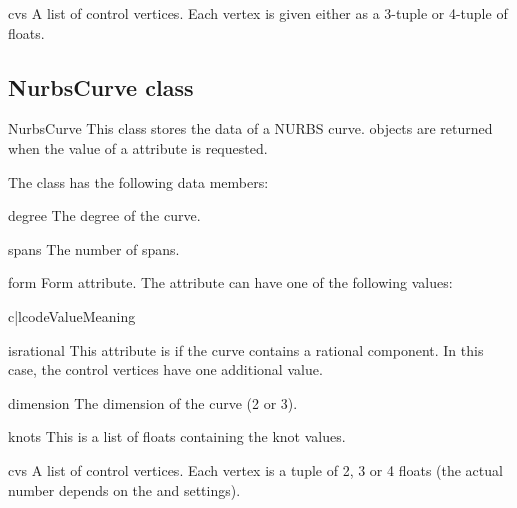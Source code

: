 \begin{memberdesc}{cvs}
A list of control vertices. Each vertex is given either as a 3-tuple or
4-tuple of floats.
\end{memberdesc}

\subsection{NurbsCurve class}
\label{nurbscurve}

\begin{classdesc*}{NurbsCurve}
This class stores the data of a NURBS curve.  objects
are returned when the value of a  attribute is requested.
\end{classdesc*}

The class has the following data members:

\begin{memberdesc}{degree}
The degree of the curve.
\end{memberdesc}

\begin{memberdesc}{spans}
The number of spans.
\end{memberdesc}

\begin{memberdesc}{form}
Form attribute. The attribute can have one of the following values:

\begin{tableii}{c|l}{code}{Value}{Meaning}
\end{tableii}
\end{memberdesc}

\begin{memberdesc}{isrational}
This attribute is  if the curve contains a rational component.
In this case, the control vertices have one additional value.
\end{memberdesc}

\begin{memberdesc}{dimension}
The dimension of the curve (2 or 3).
\end{memberdesc}

\begin{memberdesc}{knots}
This is a list of floats containing the knot values.
\end{memberdesc}

\begin{memberdesc}{cvs}
A list of control vertices. Each vertex is a tuple of 2, 3 or 4 floats
(the actual number depends on the  and 
settings).
\end{memberdesc}
